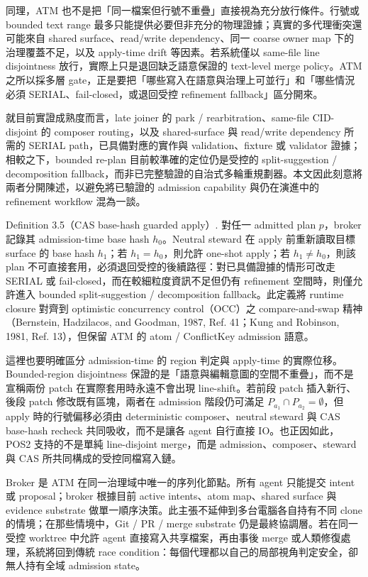 \documentclass[a4paper,fontset=none]{ctexart}
\begin{document}
同理，ATM 也不是把「同一檔案但行號不重疊」直接視為充分放行條件。行號或 bounded text range 最多只能提供必要但非充分的物理證據；真實的多代理衝突還可能來自 shared surface、read/write dependency、同一 coarse owner map 下的治理覆蓋不足，以及 apply-time drift 等因素。若系統僅以 same-file line disjointness 放行，實際上只是退回缺乏語意保證的 text-level merge policy。ATM 之所以採多層 gate，正是要把「哪些寫入在語意與治理上可並行」和「哪些情況必須 SERIAL、fail-closed，或退回受控 refinement fallback」區分開來。

就目前實證成熟度而言，late joiner 的 park / rearbitration、same-file CID-disjoint 的 composer routing，以及 shared-surface 與 read/write dependency 所需的 SERIAL path，已具備對應的實作與 validation、fixture 或 validator 證據；相較之下，bounded re-plan 目前較準確的定位仍是受控的 split-suggestion / decomposition fallback，而非已完整驗證的自治式多輪重規劃器。本文因此刻意將兩者分開陳述，以避免將已驗證的 admission capability 與仍在演進中的 refinement workflow 混為一談。

Definition 3.5（CAS base-hash guarded apply）. 對任一 admitted plan $p$，broker 記錄其 admission-time base hash $h_0$。Neutral steward 在 apply 前重新讀取目標 surface 的 base hash $h_1$；若 $h_1 = h_0$，則允許 one-shot apply；若 $h_1 \neq h_0$，則該 plan 不可直接套用，必須退回受控的後續路徑：對已具備證據的情形可改走 SERIAL 或 fail-closed，而在較細粒度資訊不足但仍有 refinement 空間時，則僅允許進入 bounded split-suggestion / decomposition fallback。此定義將 runtime closure 對齊到 optimistic concurrency control（OCC）之 compare-and-swap 精神（Bernstein, Hadzilacos, and Goodman, 1987, Ref. 41；Kung and Robinson, 1981, Ref. 13），但保留 ATM 的 atom / ConflictKey admission 語意。

這裡也要明確區分 admission-time 的 region 判定與 apply-time 的實際位移。Bounded-region disjointness 保證的是「語意與編輯意圖的空間不重疊」，而不是宣稱兩份 patch 在實際套用時永遠不會出現 line-shift。若前段 patch 插入新行、後段 patch 修改既有區塊，兩者在 admission 階段仍可滿足 $P_{a_1} \cap P_{a_2} = \emptyset$，但 apply 時的行號偏移必須由 deterministic composer、neutral steward 與 CAS base-hash recheck 共同吸收，而不是讓各 agent 自行直接 IO。也正因如此，POS2 支持的不是單純 line-disjoint merge，而是 admission、composer、steward 與 CAS 所共同構成的受控同檔寫入鏈。

Broker 是 ATM 在同一治理域中唯一的序列化節點。所有 agent 只能提交 intent 或 proposal；broker 根據目前 active intents、atom map、shared surface 與 evidence substrate 做單一順序決策。此主張不延伸到多台電腦各自持有不同 clone 的情境；在那些情境中，Git / PR / merge substrate 仍是最終協調層。若在同一受控 worktree 中允許 agent 直接寫入共享檔案，再由事後 merge 或人類修復處理，系統將回到傳統 race condition：每個代理都以自己的局部視角判定安全，卻無人持有全域 admission state。
\end{document}
